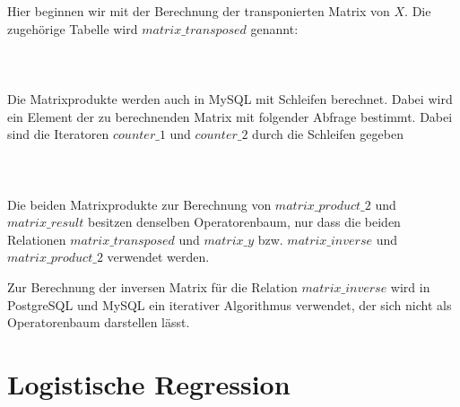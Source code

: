 Hier beginnen wir mit der Berechnung der transponierten Matrix von $X$. Die zugehörige Tabelle wird $matrix\_transposed$ genannt:
\\\\
\noindent{}
\\\\
Die Matrixprodukte werden auch in MySQL mit Schleifen berechnet. Dabei wird ein Element der zu berechnenden Matrix mit folgender Abfrage bestimmt. Dabei sind die Iteratoren $counter\_1$ und $counter\_2$ durch die Schleifen gegeben
\\\\
\noindent{}
\\\\
Die beiden Matrixprodukte zur Berechnung von $matrix\_product\_2$ und $matrix\_result$ besitzen denselben Operatorenbaum, nur dass die beiden Relationen $matrix\_transposed$ und $matrix\_y$ bzw. $matrix\_inverse$ und $matrix\_product\_2$ verwendet werden.

Zur Berechnung der inversen Matrix für die Relation $matrix\_inverse$ wird in PostgreSQL und MySQL ein iterativer Algorithmus verwendet, der sich nicht als Operatorenbaum darstellen lässt.

\section{Logistische Regression}
\label{section:5:3}

